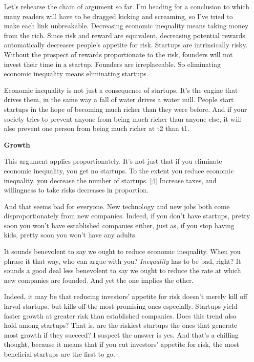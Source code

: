 Let's rehearse the chain of argument so far. I'm heading for a
conclusion to which many readers will have to be dragged kicking and
screaming, so I've tried to make each link unbreakable. Decreasing
economic inequality means taking money from the rich. Since risk and
reward are equivalent, decreasing potential rewards automatically
decreases people's appetite for risk. Startups are intrinsically risky.
Without the prospect of rewards proportionate to the risk, founders will
not invest their time in a startup. Founders are irreplaceable. So
eliminating economic inequality means eliminating startups.

Economic inequality is not just a consequence of startups. It's the
engine that drives them, in the same way a fall of water drives a water
mill. People start startups in the hope of becoming much richer than
they were before. And if your society tries to prevent anyone from being
much richer than anyone else, it will also prevent one person from being
much richer at t2 than t1.

\textbf{Growth}

This argument applies proportionately. It's not just that if you
eliminate economic inequality, you get no startups. To the extent you
reduce economic inequality, you decrease the number of startups.
{[}\hyperref[f4n]{4}{]} Increase taxes, and willingness to take risks
decreases in proportion.

And that seems bad for everyone. New technology and new jobs both come
disproportionately from new companies. Indeed, if you don't have
startups, pretty soon you won't have established companies either, just
as, if you stop having kids, pretty soon you won't have any adults.

It sounds benevolent to say we ought to reduce economic inequality. When
you phrase it that way, who can argue with you? \emph{Inequality} has to
be bad, right? It sounds a good deal less benevolent to say we ought to
reduce the rate at which new companies are founded. And yet the one
implies the other.

Indeed, it may be that reducing investors' appetite for risk doesn't
merely kill off larval startups, but kills off the most promising ones
especially. Startups yield faster growth at greater risk than
established companies. Does this trend also hold among startups? That
is, are the riskiest startups the ones that generate most growth if they
succeed? I suspect the answer is yes. And that's a chilling thought,
because it means that if you cut investors' appetite for risk, the most
beneficial startups are the first to go.

